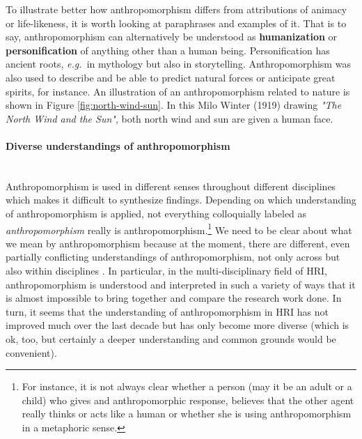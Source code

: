 \documentclass{frontiersSCNS} %
\newcommand{\eg}{{\textit{e.g.~}}}
\begin{document}
To illustrate better how anthropomorphism differs from attributions of animacy or life-likeness, it is worth looking at paraphrases and examples of it. That is to say, anthropomorphism can alternatively be understood as \textbf{humanization} or \textbf{personification} of anything other than a human being. Personification has ancient roots, \eg in mythology but also in storytelling. Anthropomorphism was also used to describe and be able to predict natural forces or anticipate great spirits, for instance. An illustration of an anthropomorphism related to nature is shown in Figure \ref{fig:north-wind-sun}. In this Milo Winter (1919) drawing \textit{"The North Wind and the Sun"}, both north wind and sun are given a human face.


\paragraph*{Diverse understandings of anthropomorphism\\ \\}

Anthropomorphism is used in different senses throughout different disciplines \citep{duffy_anthropomorphism_2003} which makes it difficult to synthesize findings. Depending on which understanding of anthropomorphism is applied, not everything colloquially labeled as \emph{anthropomorphism} really is anthropomorphism.\footnote{For instance, it is not always clear whether a person (may it be an adult or a child) who gives and anthropomorphic response, believes that the other agent really thinks or acts like a human or whether she is using anthropomorphism in a metaphoric sense.\citep{leeds_childrens_1992}} We need to be clear about what we mean by anthropomorphism because at the moment, there are different, even partially conflicting understandings of anthropomorphism, not only across but also within disciplines \cite{duffy_anthropomorphism_2002}. In particular, in the multi-disciplinary field of HRI, anthropomorphism is understood and interpreted in such a variety of ways that it is almost impossible to bring together and compare the research work done. In turn, it seems that the understanding of anthropomorphism in HRI has not improved much over the last decade but has only become more diverse (which is ok, too, but certainly a deeper understanding and common grounds would be convenient). 
\end{document}
